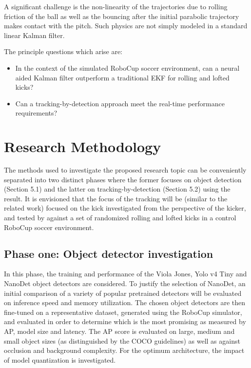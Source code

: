 \documentclass[a4paper,twoside,12pt]{report}
\begin{document}
A significant challenge is the non-linearity of the trajectories due to rolling friction of the ball as well as the bouncing after the initial parabolic trajectory makes contact with the pitch. Such physics are not simply modeled in a standard linear Kalman filter. 

The principle questions which arise are:
\begin{itemize}
    \item In the context of the simulated RoboCup soccer environment, can a neural aided Kalman filter outperform a traditional EKF for rolling and lofted kicks?
	\item Can a tracking-by-detection approach meet the real-time performance requirements?
\end{itemize}

\chapter{Research Methodology}

The methods used to investigate the proposed research topic can be conveniently separated into two distinct phases where the former focuses on object detection (Section 5.1) and the latter on tracking-by-detection (Section 5.2) using the result. It is envisioned that the focus of the tracking will be (similar to the related work) focused on  the kick investigated from the perspective of the kicker, and tested by against a set of randomized rolling and lofted kicks in a control RoboCup soccer environment. 

\section{Phase one: Object detector investigation}

In this phase, the training and performance of the Viola Jones, Yolo v4 Tiny and NanoDet object detectors are considered. To justify the selection of NanoDet, an initial comparison of a variety of popular pretrained detectors will be evaluated on inference speed and memory utilization. The chosen object detectors are then fine-tuned on a representative dataset, generated using the RoboCup simulator, and evaluated in order to determine which is the most promising as measured by AP, model size and latency. The AP score is evaluated on large, medium and small object sizes (as distinguished by the COCO guidelines) as well as against occlusion and background complexity. For the optimum architecture, the impact of model quantization is investigated.
\end{document}

